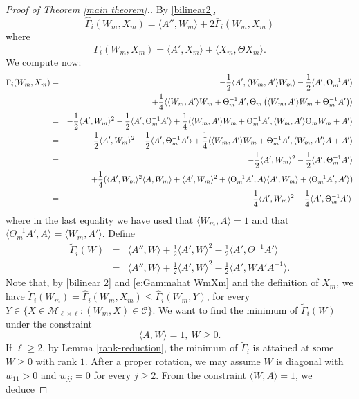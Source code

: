 \documentclass[12pt]{amsart}
\newcommand{\1}{\mathbf 1}
\newcommand{\M}{{\mathcal M}}
\begin{document}
\begin{proof}[Proof of Theorem \ref{main theorem}.]
By \eqref{bilinear2},
\begin{equation}\label{bilinear 2}
\hat\Gamma_i(W_m,X_m)=\langle A'',W_m\rangle+2\bar \Gamma_i(W_m,X_m)
\end{equation} 
where
$$
\bar \Gamma_i(W_m,X_m)=\langle A',X_m\rangle+\langle X_m,\Theta X_m\rangle.
$$
We compute now:
\begin{eqnarray}\label{e:Gammahat WmXm}
\bar \Gamma_i(W_m,X_m)&=&-\frac12\langle A',\langle W_m,A'\rangle W_m\rangle-\frac12\langle A',\Theta_m^{-1}A'\rangle\notag\\
&&+\frac14\langle\langle W_m,A'\rangle W_m+\Theta_m^{-1}A',\Theta_m\left(\langle W_m, A'\rangle W_m+\Theta_m^{-1}A'\right)\rangle\notag\\
&=&-\frac12\langle A',W_m\rangle^2-\frac12\langle A',\Theta_m^{-1}A'\rangle
+\frac14\langle\langle W_m,A'\rangle W_m+\Theta_m^{-1}A',\langle W_m, A'\rangle\Theta_m W_m+A'\rangle\notag\\
&=&-\frac12\langle A',W_m\rangle^2-\frac12\langle A',\Theta_m^{-1}A'\rangle
+\frac14\langle\langle W_m,A'\rangle W_m+\Theta_m^{-1}A',\langle W_m, A'\rangle A+A'\rangle\notag\\
&=&-\frac12\langle A',W_m\rangle^2-\frac12\langle A',\Theta_m^{-1}A'\rangle\notag\\
&&+\frac14(\langle A',W_m\rangle^2\langle A,W_m\rangle+\langle A',W_m\rangle^2
+\langle\Theta_m^{-1}A',A\rangle\langle A',W_m\rangle+\langle\Theta_m^{-1}A',A'\rangle)\notag\\
&=&\frac14\langle A',W_m\rangle^2-\frac14\langle A',\Theta_m^{-1}A'\rangle\,
\end{eqnarray}
where in the last equality we have used that $\langle W_m,A\rangle=1$ and that $\langle\Theta_m^{-1}A',A\rangle=\langle W_m,A'\rangle$. Define
\begin{eqnarray}\label{bilinear 3}
\tilde\Gamma_i(W)&=&\langle A'',W\rangle+\frac12\langle A',W\rangle^2
-\frac12\langle A',\Theta^{-1}A'\rangle\\
&=&\langle A'',W\rangle+\frac12\langle A',W\rangle^2-\frac12\langle A', WA'A^{-1}\rangle.
\end{eqnarray} 
Note that, by \eqref{bilinear 2} and \eqref{e:Gammahat WmXm} and the definition of $X_m$, we have $\tilde \Gamma_i(W_m)=\hat \Gamma_i(W_m, X_m)\le \hat \Gamma_i(W_m, Y)$, for every $Y\in \{X\in\M_{\ell\times\ell}\colon (W_m,X)\in \mathcal{C}\}$. We want to find the minimum of $\tilde \Gamma_i(W)$ under the constraint
\[
\langle A,W\rangle=1, \ W\ge 0.
\]
If $\ell\ge2$, by Lemma \ref{rank-reduction}, the minimum of $\tilde \Gamma_i$ is attained at some $W\ge 0$ with rank $1$. After a proper rotation, we may assume $W$ is diagonal with $w_{11}>0$ and $w_{jj}=0$ for every $j\ge 2$. From the constraint $\langle W, A\rangle =1$, we deduce

\end{proof}
\end{document}
